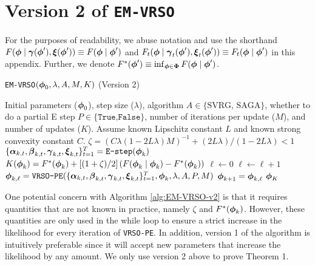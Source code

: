 \section{Version 2 of \texttt{EM-VRSO}}

For the purposes of readability, we abuse notation and use the shorthand $F(\boldsymbol{\phi} \mid \boldsymbol{\gamma}(\boldsymbol{\phi}'), \boldsymbol{\xi}(\boldsymbol{\phi}')) \equiv F(\boldsymbol{\phi} \mid \boldsymbol{\phi}')$ and $F_{t}(\boldsymbol{\phi} \mid \boldsymbol{\gamma}_{t}(\boldsymbol{\phi}'), \boldsymbol{\xi}_{t}(\boldsymbol{\phi}')) \equiv F_{t}(\boldsymbol{\phi} \mid \boldsymbol{\phi}')$ in this appendix. Further, we denote $F^*(\boldsymbol{\phi}') \equiv \inf_{\boldsymbol{\phi} \in \boldsymbol{\Phi}} F(\boldsymbol{\phi} \mid \boldsymbol{\phi}')$.

\begin{algorithm}
\caption{\texttt{EM-VRSO}$(\boldsymbol{\phi}_0, \lambda, A, M, K)$ (Version 2)}\label{alg:EM-VRSO-v2}
\begin{algorithmic}[1]
\Require Initial parameters ($\boldsymbol{\phi}_{0}$), step size ($\lambda$), algorithm $A \in \{\text{SVRG, SAGA}\}$, whether to do a partial E step $P \in \{\texttt{True,False}\}$, number of iterations per update ($M$), and number of updates ($K$). Assume known Lipschitz constant $L$ and known strong convexity constant $C$.
%
\vspace{5pt}
%
\State $\zeta = (C \lambda(1-2L\lambda)M)^{-1} + (2L\lambda) / (1-2L\lambda) < 1$ 
%
%
% 
\State $\{\boldsymbol{\alpha}_{k,t},\boldsymbol{\beta}_{k,t},\boldsymbol{\gamma}_{k,t},\boldsymbol{\xi}_{k,t}\}_{t=1}^{T} = \texttt{E-step}(\boldsymbol{\phi}_{k})$ 
%
\State $K(\boldsymbol{\phi}_{k}) = F^{*}(\boldsymbol{\phi}_{k}) + \left[(1 + \zeta) / 2\right]\left(F(\boldsymbol{\phi}_{k} \mid \boldsymbol{\phi}_{k}) - F^{*}(\boldsymbol{\phi}_{k})\right)$
%
\State $\ell \gets 0$ 
%
\State $\ell \gets \ell+1$
\State $\boldsymbol{\phi}_{k,\ell} = \texttt{VRSO-PE}(\{\boldsymbol{\alpha}_{k,t},\boldsymbol{\beta}_{k,t},\boldsymbol{\gamma}_{k,t},\boldsymbol{\xi}_{k,t}\}_{t=1}^{T},\boldsymbol{\phi}_{k},\lambda,A,P,M)$
%
\EndWhile
\State $\boldsymbol{\phi}_{k+1} = \boldsymbol{\phi}_{k,\ell}$
\EndFor
\State \Return $\boldsymbol{\phi}_K$
\end{algorithmic}
\end{algorithm}

One potential concern with Algorithm \ref{alg:EM-VRSO-v2} is that it requires quantities that are not known in practice, namely $\zeta$ and $F^{*}(\boldsymbol{\phi}_{k})$. However, these quantities are only used in the while loop to ensure a strict increase in the likelihood for every iteration of \texttt{VRSO-PE}. In addition, version 1 of the algorithm is intuitively preferable since it will accept new parameters that increase the likelihood by any amount. We only use version 2 above to prove Theorem 1.

